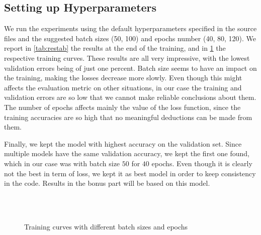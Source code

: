 \documentclass{article}
\begin{document}
\subsection{Setting up Hyperparameters}

We run the experiments using the default hyperparameters specified in the source files and the suggested batch sizes (50, 100) and epochs number (40, 80, 120). We report in \cref{tab:restab} the results at the end of the training, and in \cref{fig:results} the respective training curves. These results are all very impressive, with the lowest validation errors being of just one percent. Batch size seems to have an impact on the training, making the losses decrease more slowly. Even though this might affects the evaluation metric on other situations, in our case the training and validation errors are so low that we cannot make reliable conclusions about them. The number of epochs affects mainly the value of the loss function, since the training accuracies are so high that no meaningful deductions can be made from them.

Finally, we kept the model with highest accuracy on the validation set. Since multiple models have the same validation accuracy, we kept the first one found, which in our case was with batch size $50$ for $40$ epochs. Even though it is clearly not the best in term of loss, we kept it as best model in order to keep consistency in the code. Results in the bonus part will be based on this model. 

\begin{figure}[h]
    \centering
    \caption{Training curves with different batch sizes and epochs}
    \\
    \\
\label{fig:results}
\end{figure}
\end{document}
